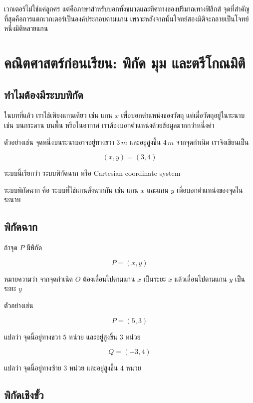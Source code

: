\documentclass[12pt,a4paper]{report}
\begin{document}
\begin{tcolorbox}[title=แนวคิดสำคัญของบทนี้]
เวกเตอร์ไม่ใช่แค่ลูกศร แต่คือภาษาสำหรับบอกทั้งขนาดและทิศทางของปริมาณทางฟิสิกส์ จุดที่สำคัญที่สุดคือการแตกเวกเตอร์เป็นองค์ประกอบตามแกน เพราะหลังจากนั้นโจทย์สองมิติจะกลายเป็นโจทย์หนึ่งมิติหลายแกน
\end{tcolorbox}

\section{คณิตศาสตร์ก่อนเรียน: พิกัด มุม และตรีโกณมิติ}

\subsection{ทำไมต้องมีระบบพิกัด}

ในบทที่แล้ว เราใช้เพียงแกนเดียว เช่น แกน $x$ เพื่อบอกตำแหน่งของวัตถุ แต่เมื่อวัตถุอยู่ในระนาบ เช่น บนกระดาน บนพื้น หรือในอากาศ เราต้องบอกตำแหน่งด้วยข้อมูลมากกว่าหนึ่งค่า

ตัวอย่างเช่น จุดหนึ่งบนระนาบอาจอยู่ทางขวา $3\,\si{m}$ และอยู่สูงขึ้น $4\,\si{m}$ จากจุดกำเนิด เราจึงเขียนเป็น

\[
(x,y)=(3,4)
\]

ระบบนี้เรียกว่า ระบบพิกัดฉาก หรือ Cartesian coordinate system

\begin{tcolorbox}[title=นิยาม]
ระบบพิกัดฉาก คือ ระบบที่ใช้แกนตั้งฉากกัน เช่น แกน $x$ และแกน $y$ เพื่อบอกตำแหน่งของจุดในระนาบ
\end{tcolorbox}

\subsection{พิกัดฉาก}

ถ้าจุด $P$ มีพิกัด

\[
P=(x,y)
\]

หมายความว่า จากจุดกำเนิด $O$ ต้องเลื่อนไปตามแกน $x$ เป็นระยะ $x$ แล้วเลื่อนไปตามแกน $y$ เป็นระยะ $y$

ตัวอย่างเช่น

\[
P=(5,3)
\]

แปลว่า จุดนี้อยู่ทางขวา $5$ หน่วย และอยู่สูงขึ้น $3$ หน่วย

\[
Q=(-3,4)
\]

แปลว่า จุดนี้อยู่ทางซ้าย $3$ หน่วย และอยู่สูงขึ้น $4$ หน่วย

\subsection{พิกัดเชิงขั้ว}
\end{document}
